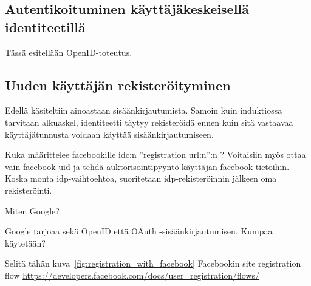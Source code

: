 \documentclass[finnish,gradu]{tktltiki}
\begin{document}


  \subsection{Autentikoituminen käyttäjäkeskeisellä identiteetillä} %
  \label{sub:autentikoituminen_käyttäjäkeskeisellä_identiteetillä}

  Tässä esitellään OpenID-toteutus.


  \subsection{Uuden käyttäjän rekisteröityminen} %
  \label{sub:uuden_käyttäjän_rekisteröityminen}

  Edellä käsiteltiin ainoastaan sisäänkirjautumista. Samoin kuin induktiossa tarvitaan alkuaskel, identiteetti täytyy rekisteröidä ennen kuin sitä vastaavaa käyttäjätunnusta voidaan käyttää sisäänkirjautumiseen.

  Kuka määrittelee facebookille idc:n ''registration url:n'':n ? Voitaisiin myös ottaa vain facebook uid ja tehdä auktorisointipyyntö käyttäjän facebook-tietoihin. Koska monta idp-vaihtoehtoa, suoritetaan idp-rekisteröinnin jälkeen oma rekisteröinti.

  Miten Google?

  Google tarjoaa sekä OpenID että OAuth -sisäänkirjautumisen. Kumpaa käytetään?

  Selitä tähän kuva~\ref{fig:registration_with_facebook} Facebookin site registration flow \url{https://developers.facebook.com/docs/user_registration/flows/}
\end{document}
